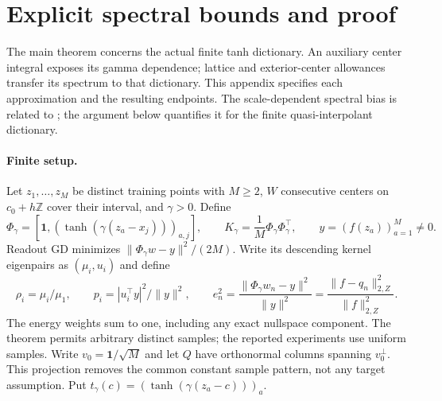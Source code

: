 \section{Explicit spectral bounds and proof}
\label{app:note-spectrum}

The main theorem concerns the actual finite tanh dictionary. An auxiliary
center integral exposes its gamma dependence; lattice and exterior-center
allowances transfer its spectrum to that dictionary. This appendix specifies
each approximation and the resulting endpoints.
The scale-dependent spectral bias is related to
\citet{xu2020frequency,tancik2020fourier}; the argument below quantifies it
for the finite quasi-interpolant dictionary.

\paragraph{Finite setup.}
Let $z_1,\ldots,z_M$ be distinct training points with $M\ge2$, $W$ consecutive centers on
$c_0+h\mathbb Z$ cover their interval, and $\gamma>0$. Define
\begin{equation}
 \Phi_\gamma=[\mathbf1,(\tanh(\gamma(z_a-x_j)))_{a,j}],\qquad
 K_\gamma=\frac1M\Phi_\gamma\Phi_\gamma^\top,\qquad
 y=(f(z_a))_{a=1}^M\ne0.
\end{equation}
Readout GD minimizes $\|\Phi_\gamma w-y\|^2/(2M)$.
Write its descending kernel eigenpairs as $(\mu_i,u_i)$ and define
\begin{equation}
 \rho_i=\mu_i/\mu_1,\qquad
 p_i=|u_i^\top y|^2/\|y\|^2,\qquad
 e_n^2=\frac{\|\Phi_\gamma w_n-y\|^2}{\|y\|^2}
 =\frac{\|f-q_n\|_{2,Z}^2}{\|f\|_{2,Z}^2}.
\end{equation}
The energy weights sum to one, including any exact nullspace component.
The theorem permits arbitrary distinct samples; the reported experiments use
uniform samples. Write $v_0=\mathbf1/\sqrt M$ and let $Q$ have orthonormal
columns spanning $v_0^\perp$. This projection removes the common constant
sample pattern, not any target assumption. Put
$t_\gamma(c)=(\tanh(\gamma(z_a-c)))_a$.

